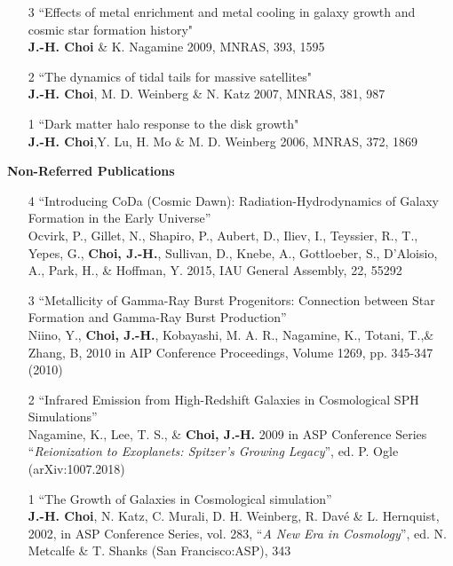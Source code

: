 \documentclass [11pt]{article}
\begin{document}
{{\begin{enumerate}
\item[3]``Effects of metal enrichment and metal cooling in galaxy growth and cosmic star formation history" \\  \textbf{J.-H. Choi} \& K. Nagamine 2009, MNRAS, 393, 1595

\item[2] ``The dynamics of tidal tails for massive satellites" \\  \textbf{J.-H. Choi}, M. D. Weinberg \& N. Katz 2007, MNRAS, 381, 987

\item[1]``Dark matter halo response to the disk growth" \\  \textbf{J.-H. Choi},Y. Lu, H. Mo \& M. D. Weinberg 2006, MNRAS, 372, 1869

\end{enumerate}

\vspace{.25in}
\noindent
{\textbf{Non-Referred Publications}}
\begin{enumerate}

\item[4] ``Introducing CoDa (Cosmic Dawn): Radiation-Hydrodynamics of Galaxy Formation in the Early Universe''\\ Ocvirk, P., Gillet, N., Shapiro, P., Aubert, D., Iliev, I., Teyssier, R., T., Yepes, G., \textbf{Choi, J.-H.}, Sullivan, D., Knebe, A., Gottloeber, S., D'Aloisio, A., Park, H., \& Hoffman, Y. 2015, IAU General Assembly, 22, 55292

\item[3]``Metallicity of Gamma-Ray Burst Progenitors: Connection between Star Formation and Gamma-Ray Burst Production''\\ Niino, Y., \textbf{Choi, J.-H.}, Kobayashi, M. A. R., Nagamine, K., Totani, T.,\& Zhang, B, 2010 in AIP Conference Proceedings, Volume 1269, pp. 345-347 (2010)

\item[2]``Infrared Emission from High-Redshift Galaxies in Cosmological SPH Simulations''\\ Nagamine, K., Lee, T. S., \& \textbf{Choi, J.-H.} 2009 in ASP Conference Series ``\emph{Reionization to Exoplanets: Spitzer's Growing Legacy}'', ed. P. Ogle (arXiv:1007.2018) 

\item[1]``The Growth of Galaxies in Cosmological simulation'' \\  \textbf{J.-H. Choi}, N. Katz, C. Murali, D. H. Weinberg, R. Dav\'{e} \& L. Hernquist, 2002, in ASP Conference Series, vol. 283, ``\emph{A New Era in Cosmology}'', ed. N. Metcalfe \& T. Shanks (San Francisco:ASP), 343


\end{enumerate}}}
\end{document}
